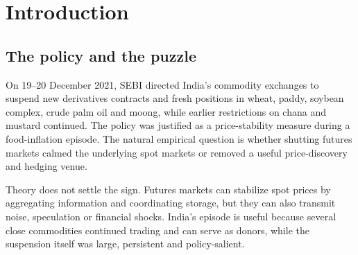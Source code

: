 \begin{abstract}
In December 2021 the Securities and Exchange Board of India (SEBI) suspended
exchange-traded derivatives in seven agricultural commodities. We evaluate whether
the suspension delivered its stated price-stability objective using district-level
mandi spot prices from CEDA/Agmarknet, realized-volatility panels, difference-in-
differences, Synthetic DiD, and synthetic control. An inherited claim held that the
suspension raised spot volatility by roughly $8$--$10\%$. That claim is refuted.
The current food-donor rerun estimates an aggregate DiD effect of $-9.8\%$, but it
is not statistically significant under honest few-cluster inference (CR1 $p=0.145$;
wild bootstrap $p=0.153$). The lower-volatility signal is concentrated in chana:
Synthetic DiD gives $-38.7\%$ ($z=-2.05$), and commodity-level synthetic control gives
$-37.3\%$ at the placebo-resolution floor. Wheat collapses to approximately zero under
Synthetic DiD, consistent with MSP/export-ban confounding. The honest conclusion is
therefore not that the ban robustly reduced volatility, but that it did not raise spot
volatility and that any lower-volatility evidence is chana-centered and donor-sensitive.
The full food/oilseed donor pull and additional inference upgrades remain pending.
\end{abstract}

\section{Introduction}
\label{sec:intro}

\subsection{The policy and the puzzle}

On 19--20 December 2021, SEBI directed India's commodity exchanges to suspend new
derivatives contracts and fresh positions in wheat, paddy, soybean complex, crude
palm oil and moong, while earlier restrictions on chana and mustard continued. The
policy was justified as a price-stability measure during a food-inflation episode.
The natural empirical question is whether shutting futures markets calmed the
underlying spot markets or removed a useful price-discovery and hedging venue.

Theory does not settle the sign. Futures markets can stabilize spot prices by
aggregating information and coordinating storage, but they can also transmit noise,
speculation or financial shocks. India's episode is useful because several close
commodities continued trading and can serve as donors, while the suspension itself
was large, persistent and policy-salient.

